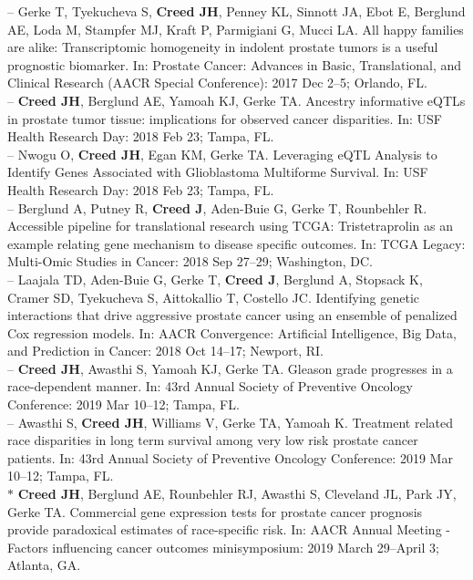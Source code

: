 \documentclass[11pt, a4paper]{article} %
\begin{document}
-- Gerke T, Tyekucheva S, {\bf Creed JH}, Penney KL, Sinnott JA, Ebot E, Berglund AE, Loda M, Stampfer MJ, Kraft P, Parmigiani G, Mucci LA. All happy families are alike: Transcriptomic homogeneity in indolent prostate tumors is a useful prognostic biomarker. In: Prostate Cancer: Advances in Basic, Translational, and Clinical Research (AACR Special Conference): 2017 Dec 2--5; Orlando, FL. \\

-- {\bf Creed JH}, Berglund AE, Yamoah KJ, Gerke TA. Ancestry informative eQTLs in prostate tumor tissue: implications for observed cancer disparities. In: USF Health Research Day: 2018 Feb 23; Tampa, FL. \\

-- Nwogu O, {\bf Creed JH}, Egan KM, Gerke TA. Leveraging eQTL Analysis to Identify Genes Associated with Glioblastoma Multiforme Survival. In: USF Health Research Day: 2018 Feb 23; Tampa, FL. \\

-- Berglund A, Putney R, {\bf Creed J}, Aden-Buie G, Gerke T, Rounbehler R. Accessible pipeline for translational research using TCGA: Tristetraprolin as an example relating gene mechanism to disease specific outcomes. In: TCGA Legacy: Multi-Omic Studies in Cancer: 2018 Sep 27--29; Washington, DC.\\

-- Laajala TD, Aden-Buie G, Gerke T, {\bf Creed J}, Berglund A, Stopsack K, Cramer SD, Tyekucheva S, Aittokallio T, Costello JC. Identifying genetic interactions that drive aggressive prostate cancer using an ensemble of penalized Cox regression models.  In: AACR Convergence: Artificial Intelligence, Big Data, and Prediction in Cancer: 2018 Oct 14--17; Newport, RI. \\

-- {\bf Creed JH}, Awasthi S, Yamoah KJ, Gerke TA. Gleason grade progresses in a race-dependent manner. In: 43rd Annual Society of Preventive Oncology Conference: 2019 Mar 10--12; Tampa, FL. \\

-- Awasthi S, {\bf Creed JH}, Williams V, Gerke TA, Yamoah K. Treatment related race disparities in long term survival among very low risk prostate cancer patients. In: 43rd Annual Society of Preventive Oncology Conference: 2019 Mar 10--12; Tampa, FL. \\

$*$ {\bf Creed JH}, Berglund AE, Rounbehler RJ, Awasthi S, Cleveland JL, Park JY, Gerke TA. Commercial gene expression tests for prostate cancer prognosis provide  paradoxical estimates of race-specific risk. In: AACR Annual Meeting - Factors influencing cancer outcomes minisymposium: 2019 March 29--April 3; Atlanta, GA. \\
\end{document}
